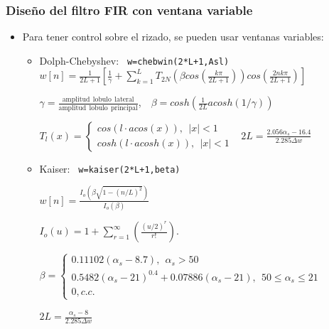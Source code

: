 \documentclass[handout]{beamer}
\numberwithin{section}{part}
\begin{document}
\begin{frame}
  \frametitle{Diseño del filtro FIR con ventana variable}
  \footnotesize
  \begin{itemize}
    \item Para tener control sobre el rizado, se pueden usar ventanas variables:
    \begin{itemize}
    \footnotesize
    \item \alert{Dolph-Chebyshev}: \texttt{ w=chebwin(2*L+1,Asl)}
    $w[n]=\frac{1}{2L+1}\left[ \frac{1}{\gamma}+\sum_{k=1}^L T_{2N}\left( \beta cos (\frac{k\pi}{2L+1})\right) cos (\frac{2nk\pi}{2L+1})\right]$
    
    $\gamma=\frac{\mathrm{amplitud \:\: lobulo  \:\: lateral}}{\mathrm{amplitud \:\: lobulo  \:\: principal}}$,  $\:\:\:\beta=cosh\left(\frac{1}{2L}acosh(1/\gamma)\right)$
    
    $T_l(x)=\left \{ \begin{array}{l}cos(l \cdot acos(x)), \:\: |x|<1\\cosh(l \cdot acosh(x)), \:\: |x|<1 \end{array}\right .$
    \alert{$\:\:2L=\frac{2.056\alpha_s-16.4}{2.285\Delta w}$}
    
    
    \vspace{0.2cm}
    
    
    \item \alert{Kaiser}: \texttt{ w=kaiser(2*L+1,beta)}
    
    \vspace{0.1cm}
    
    $w[n]=\frac{I_o\left(\beta \sqrt{1-(n/L)^2}\right)}{I_o\left(\beta\right)}$
    
    \vspace{0.1cm}
    
    $I_o(u)=1+\sum_{r=1}^\infty \left(\frac{(u/2)^r}{r!}\right).$
    
    $\beta=\left\{\begin{array}{l}0.11102(\alpha_s-8.7), \:\: \alpha_s>50\\0.5482(\alpha_s-21)^{0.4}+0.07886(\alpha_s-21), \:\: 50 \le \alpha_s \le 21\\0, c.c.\end{array} \right .$
    
    
    \alert{$2L=\frac{\alpha_s-8}{2.285\Delta w}$}
    
    \end{itemize}
  \end{itemize}
\end{frame}
  
\end{document}
